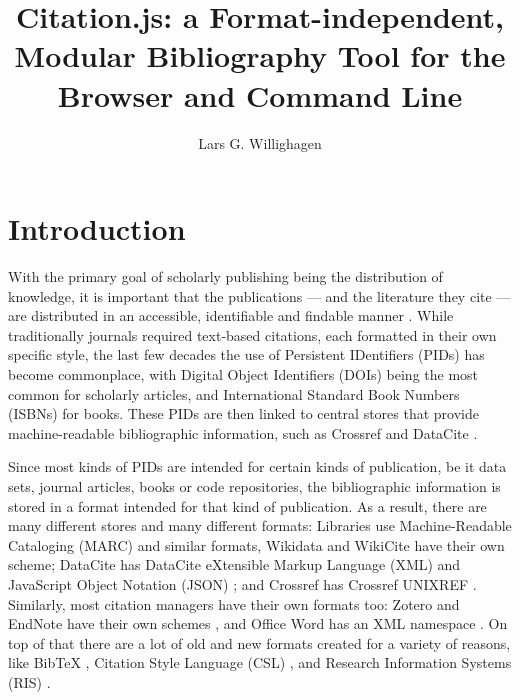 \documentclass[fleqn,10pt,lineno]{wlpeerj} %
\title{Citation.js: a Format-independent, Modular Bibliography Tool for the Browser and Command Line}
\author[1]{Lars G. Willighagen}
\affil[1]{Eindhoven, The Netherlands}
\begin{document}
\flushbottom
\maketitle
\thispagestyle{empty}

\section*{Introduction}

With the primary goal of scholarly publishing being the distribution of knowledge, it is important that the publications --- and the literature they cite --- are distributed in an accessible, identifiable and findable manner \citep{shotton_publishing:_2013}. While traditionally journals required text-based citations, each formatted in their own specific style, the last few decades the use of Persistent IDentifiers (PIDs) has become commonplace, with Digital Object Identifiers (DOIs) being the most common for scholarly articles, and International Standard Book Numbers (ISBNs) for books. These PIDs are then linked to central stores that provide machine-readable bibliographic information, such as Crossref and DataCite \cite{lammey_crossref_2015,brase_datacite_2009,neumann_datacite_2014}.

Since most kinds of PIDs are intended for certain kinds of publication, be it data sets, journal articles, books or code repositories, the bibliographic information is stored in a format intended for that kind of publication. As a result, there are many different stores and many different formats: Libraries use Machine-Readable Cataloging (MARC) \citep{avram_machine-readable_nodate} and similar formats, Wikidata \citep{vrandecic_getting_2018} and WikiCite \citep{taraborelli_wikicite_2017} have their own scheme; DataCite has DataCite eXtensible Markup Language (XML) and JavaScript Object Notation (JSON) \citep{noauthor_datacite_2017}; and Crossref has Crossref UNIXREF \citep{noauthor_unixref_nodate}. Similarly, most citation managers have their own formats too: Zotero and EndNote have their own schemes \citep{vinckevicius_zotero_2017,noauthor_endnote_nodate}, and Office Word has an XML namespace \citep{noauthor_documentformat.openxml.bibliography_nodate}. On top of that there are a lot of old and new formats created for a variety of reasons, like BibTeX \citep{patashnik_bibtexing_1988}, Citation Style Language (CSL) \citep{zelle_csl_2012}, and Research Information Systems (RIS) \citep{noauthor_ris_2012}.
\end{document}
